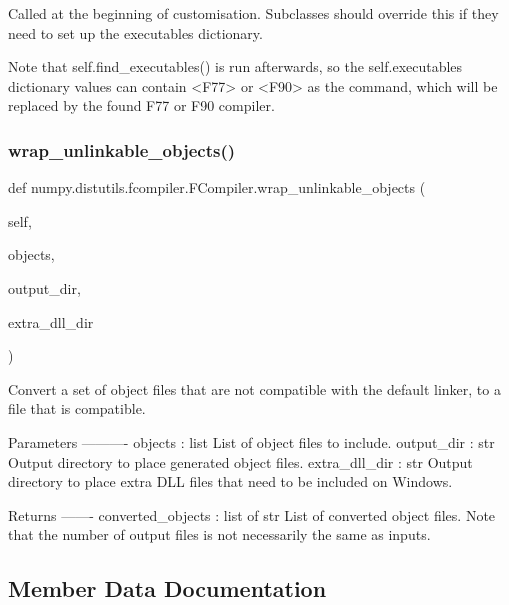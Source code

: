 \begin{DoxyVerb}Called at the beginning of customisation. Subclasses should
override this if they need to set up the executables dictionary.

Note that self.find_executables() is run afterwards, so the
self.executables dictionary values can contain <F77> or <F90> as
the command, which will be replaced by the found F77 or F90
compiler.
\end{DoxyVerb}
 \mbox{\label{classnumpy_1_1distutils_1_1fcompiler_1_1FCompiler_a5420e554458a9c84feaf633919c39890}} 
\subsubsection{\texorpdfstring{wrap\+\_\+unlinkable\+\_\+objects()}{wrap\_unlinkable\_objects()}}
{\footnotesize\ttfamily def numpy.\+distutils.\+fcompiler.\+F\+Compiler.\+wrap\+\_\+unlinkable\+\_\+objects (\begin{DoxyParamCaption}\item[{}]{self,  }\item[{}]{objects,  }\item[{}]{output\+\_\+dir,  }\item[{}]{extra\+\_\+dll\+\_\+dir }\end{DoxyParamCaption})}

\begin{DoxyVerb}Convert a set of object files that are not compatible with the default
linker, to a file that is compatible.

Parameters
----------
objects : list
    List of object files to include.
output_dir : str
    Output directory to place generated object files.
extra_dll_dir : str
    Output directory to place extra DLL files that need to be
    included on Windows.

Returns
-------
converted_objects : list of str
     List of converted object files.
     Note that the number of output files is not necessarily
     the same as inputs.\end{DoxyVerb}
 

\subsection{Member Data Documentation}
\mbox{\label{classnumpy_1_1distutils_1_1fcompiler_1_1FCompiler_a83c236256dfd59b1ba1aad74a37e7211}} 
